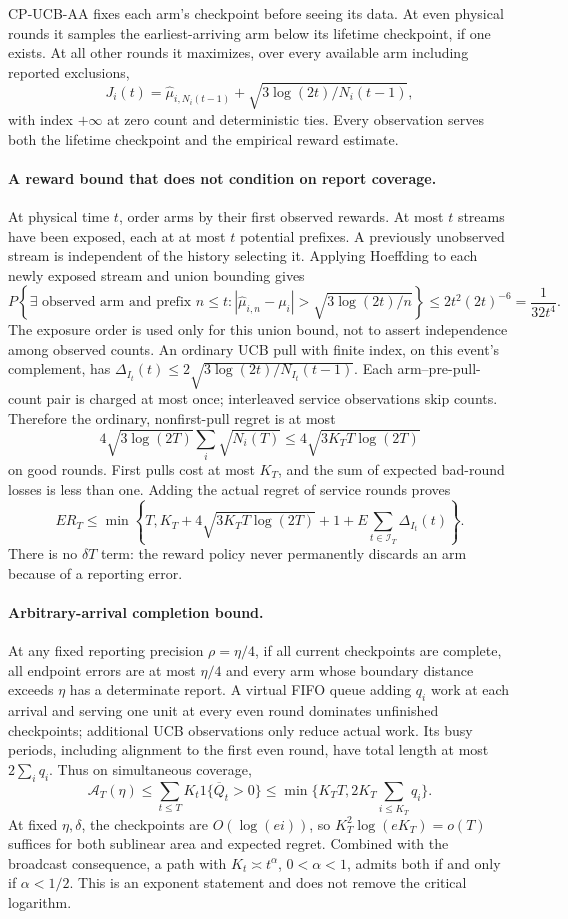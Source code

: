 CP-UCB-AA fixes each arm's checkpoint before seeing its data. At even
physical rounds it samples the earliest-arriving arm below its lifetime
checkpoint, if one exists. At all other rounds it maximizes, over every
available arm including reported exclusions,
\[
 J_i(t)=\widehat\mu_{i,N_i(t-1)}+
             \sqrt{3\log(2t)/N_i(t-1)},
\]
with index $+\infty$ at zero count and deterministic ties. Every observation
serves both the lifetime checkpoint and the empirical reward estimate.

\paragraph{A reward bound that does not condition on report coverage.}
At physical time $t$, order arms by their first observed rewards. At most
$t$ streams have been exposed, each at at most $t$ potential prefixes. A
previously unobserved stream is independent of the history selecting it.
Applying Hoeffding to each newly exposed stream and union bounding gives
\[
 P\left\{\exists\text{ observed arm and prefix }n\le t:
 |\widehat\mu_{i,n}-\mu_i|>
        \sqrt{3\log(2t)/n}\right\}
 \le2t^2(2t)^{-6}=\frac1{32t^4}.
\]
The exposure order is used only for this union bound, not to assert
independence among observed counts. An ordinary UCB pull with finite index,
on this event's complement, has
$\Delta_{I_t}(t)\le2\sqrt{3\log(2t)/N_{I_t}(t-1)}$.
Each arm--pre-pull-count pair is charged at most once; interleaved service
observations skip counts. Therefore the ordinary, nonfirst-pull regret is
at most
\[
 4\sqrt{3\log(2T)}\sum_i\sqrt{N_i(T)}
 \le4\sqrt{3K_TT\log(2T)}
\]
on good rounds. First pulls cost at most $K_T$, and the sum of expected
bad-round losses is less than one. Adding the actual regret of service
rounds proves
\[
 ER_T\le\min\left\{T,K_T+4\sqrt{3K_TT\log(2T)}+1+
       E\sum_{t\in\mathcal I_T}\Delta_{I_t}(t)\right\}.
\]
There is no $\delta T$ term: the reward policy never permanently discards an
arm because of a reporting error.

\paragraph{Arbitrary-arrival completion bound.}
At any fixed reporting precision $\rho=\eta/4$, if all current checkpoints
are complete, all endpoint errors are at most $\eta/4$ and every arm whose
boundary distance exceeds $\eta$ has a determinate report. A virtual FIFO
queue adding $q_i$ work at each arrival and serving one unit at every even
round dominates unfinished checkpoints; additional UCB observations only
reduce actual work. Its busy periods, including alignment to the first even
round, have total length at most $2\sum_iq_i$. Thus on simultaneous coverage,
\[
 \mathcal A_T(\eta)\le
 \sum_{t\le T}K_t1\{\overline Q_t>0\}
 \le\min\{K_TT,2K_T\sum_{i\le K_T}q_i\}.
\]
At fixed $\eta,\delta$, the checkpoints are $O(\log(ei))$, so
$K_T^2\log(eK_T)=o(T)$ suffices for both sublinear area and expected regret.
Combined with the broadcast consequence, a path with
$K_t\asymp t^\alpha$, $0<\alpha<1$, admits both if and only if $\alpha<1/2$.
This is an exponent statement and does not remove the critical logarithm.

